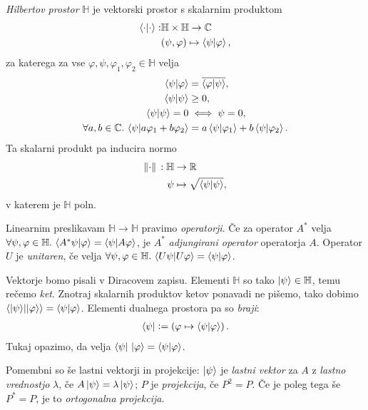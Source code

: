 \documentclass[mat1]{fmfdelo}
\newcommand{\R}{\mathbb R}
\newcommand{\C}{\mathbb C}
\newcommand{\Hb}{\mathbb H}
\renewcommand{\phi}{\varphi}
\newcommand{\defeq}{\vcentcolon=}
\newcommand{\sep}{\ensuremath{.\,}}
\begin{document}
\begin{definicija} \emph{Hilbertov prostor} \(\Hb\) je vektorski prostor s skalarnim produktom
    \begin{align*}
        \braket{\cdot}{\cdot} :& \Hb \times \Hb \to \C\\
        & (\psi, \varphi) \mapsto \braket{\psi}{\phi},
    \end{align*}
    za katerega za vse \(\phi, \psi, \varphi_1, \varphi_2 \in \Hb\) velja
    \begin{align*}
        \braket{\psi}{\varphi} &= \overline{\braket{\varphi}{\psi}},\\
        \braket\psi &\geq 0,\\
        \braket\psi = 0 &\iff \psi = 0,\\
        \forall a,b\in\C\sep \braket{\psi}{a\varphi_1 + b\varphi_2} &=a\braket{\psi}{\varphi_1} + b\braket{\psi}{\varphi_2}.
    \end{align*}
    Ta skalarni produkt pa inducira normo
    \begin{align*}
        \norm*{\cdot} : \Hb &\to \R\\
        \psi &\mapsto \sqrt{\braket\psi},
    \end{align*}
    v katerem je \(\Hb\) poln.
\end{definicija}

Linearnim preslikavam \(\Hb\to\Hb\) pravimo \emph{operatorji}. Če za operator \(A^*\) velja \(\forall \psi,\phi\in\Hb\sep\braket{A^*\psi}{\varphi} = \braket{\psi}{A\varphi}\), je \(A^*\) \emph{adjungirani operator} operatorja \(A\). Operator \(U\) je \emph{unitaren}, če velja \(\forall \psi,\varphi\in\Hb\sep \braket{U\psi}{U\varphi} = \braket{\psi}{\varphi}\).

Vektorje bomo pisali v Diracovem zapisu. Elementi \(\Hb\) so tako \(\ket{\psi}\in\Hb\), temu rečemo \emph{ket}. Znotraj skalarnih produktov ketov ponavadi ne pišemo, tako dobimo \(\braket{\ket\psi}{\ket\varphi} = \braket{\psi}{\varphi}\). Elementi dualnega prostora pa so \emph{braji}:
\begin{align*}
    \bra{\psi} \defeq \left(\varphi \mapsto \braket{\psi}{\varphi} \right).
\end{align*}
Tukaj opazimo, da velja \(\bra{\psi}\, \ket{\varphi} = \braket{\psi}{\varphi}\).

Pomembni so še lastni vektorji in projekcije: \(\ket{\psi}\) je \emph{lastni vektor} za \(A\) z \emph{lastno vrednostjo} \(\lambda\), če \(A\ket\psi = \lambda \ket\psi\); \(P\) je \emph{projekcija}, če \(P^2 = P\). Če je poleg tega še \(P^* = P\), je to \emph{ortogonalna projekcija}.
\end{document}
